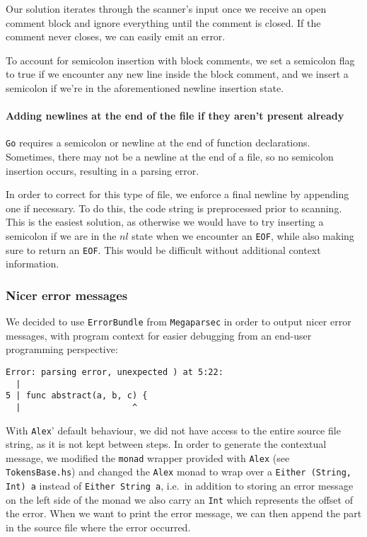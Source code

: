 \documentclass[11pt]{article}
\begin{document}
Our solution iterates through the scanner's input once we receive an
open comment block and ignore everything until the comment is closed.
If the comment never closes, we can easily emit an error.

To account for semicolon insertion with block comments, we set a
semicolon flag to true if we encounter any new line inside the
block comment, and we insert a semicolon if we're in the
aforementioned newline insertion state.
\paragraph{Adding newlines at the end of the file if they aren't present already}
\texttt{Go} requires a semicolon or newline at the end of function
declarations. Sometimes, there may not be a newline at the end of
a file, so no semicolon insertion occurs, resulting in a parsing error.

In order to correct for this type of file, we enforce a final
newline by appending one if necessary. To do this, the code string
is preprocessed prior to scanning. This is the easiest solution,
as otherwise we would have to try inserting a semicolon if we are in
the \(nl\) state when we encounter an \texttt{EOF}, while also making sure
to return an \texttt{EOF}. This would be difficult without additional
context information.
\subsubsection{Nicer error messages}
We decided to use \texttt{ErrorBundle} from \texttt{Megaparsec} in order to
output nicer error messages, with program context for easier
debugging from an end-user programming perspective:

\begin{verbatim}
Error: parsing error, unexpected ) at 5:22:
  |
5 | func abstract(a, b, c) {
  |                      ^
\end{verbatim}

With \texttt{Alex}' default behaviour, we did not have access to the entire
source file string, as it is not kept between steps. In order to
generate the contextual message, we modified the \texttt{monad} wrapper
provided with \texttt{Alex} (see \texttt{TokensBase.hs}) and changed the \texttt{Alex}
monad to wrap over a \texttt{Either (String, Int) a} instead of
\texttt{Either String a}, i.e.\ in addition to storing an error message on
the left side of the monad we also carry an \texttt{Int} which represents
the offset of the error. When we want to print the error
message, we can then append the part in the source file where
the error occurred.
\end{document}
